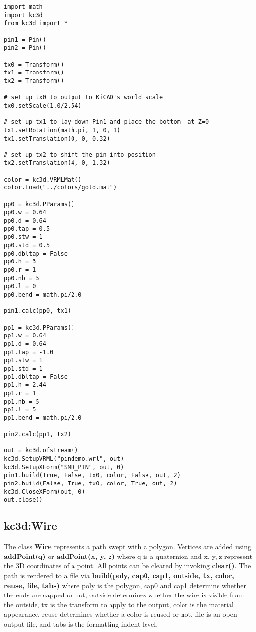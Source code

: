 \documentclass[a4paper, dvipdfm]{article}
\begin{document}
\begin{verbatim}
import math
import kc3d
from kc3d import *

pin1 = Pin()
pin2 = Pin()

tx0 = Transform()
tx1 = Transform()
tx2 = Transform()

# set up tx0 to output to KiCAD's world scale
tx0.setScale(1.0/2.54)

# set up tx1 to lay down Pin1 and place the bottom  at Z=0
tx1.setRotation(math.pi, 1, 0, 1)
tx1.setTranslation(0, 0, 0.32)

# set up tx2 to shift the pin into position
tx2.setTranslation(4, 0, 1.32)

color = kc3d.VRMLMat()
color.Load("../colors/gold.mat")

pp0 = kc3d.PParams()
pp0.w = 0.64
pp0.d = 0.64
pp0.tap = 0.5
pp0.stw = 1
pp0.std = 0.5
pp0.dbltap = False
pp0.h = 3
pp0.r = 1
pp0.nb = 5
pp0.l = 0
pp0.bend = math.pi/2.0

pin1.calc(pp0, tx1)

pp1 = kc3d.PParams()
pp1.w = 0.64
pp1.d = 0.64
pp1.tap = -1.0
pp1.stw = 1
pp1.std = 1
pp1.dbltap = False
pp1.h = 2.44
pp1.r = 1
pp1.nb = 5
pp1.l = 5
pp1.bend = math.pi/2.0

pin2.calc(pp1, tx2)

out = kc3d.ofstream()
kc3d.SetupVRML("pindemo.wrl", out)
kc3d.SetupXForm("SMD_PIN", out, 0)
pin1.build(True, False, tx0, color, False, out, 2)
pin2.build(False, True, tx0, color, True, out, 2)
kc3d.CloseXForm(out, 0)
out.close()
\end{verbatim}

\subsection{kc3d:Wire}
The class \textbf{Wire} represents a path swept with a polygon.
Vertices are added using \textbf{addPoint(q)} or \textbf{addPoint(x, y, z)}
where q is a quaternion and x, y, z represent the 3D coordinates of a point.
All points can be cleared by invoking \textbf{clear()}. The path is
rendered to a file via \textbf{build(poly, cap0, cap1, outside, tx, color, reuse, file, tabs)}
where poly is the polygon, cap0 and cap1 determine whether the ends are capped or not,
outside determines whether the wire is visible from the outside, tx is the transform
to apply to the output, color is the material appearance, reuse determines whether a
color is reused or not, file is an open output file, and tabs is the formatting
indent level.
\end{document}
